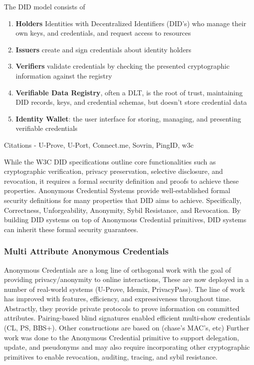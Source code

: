 The DID model consists of 
\begin{enumerate}
    \item \textbf{Holders} Identities with Decentralized Identifiers (DID's) who manage their own keys, and credentials, and request access to resources
    
    \item \textbf{Issuers} create and sign credentials about identity holders
    
    \item \textbf{Verifiers} validate credentials by checking the presented cryptographic information against the registry

    \item  \textbf{Verifiable Data Registry}, often a DLT, is the root of trust, maintaining DID records, keys, and credential schemas, but doesn't store credential data
    
    \item \textbf{Identity Wallet}: the user interface for storing, managing, and presenting verifiable credentials
\end{enumerate}
 
Citations
- U-Prove, U-Port, Connect.me, Sovrin, PingID, w3c

While the W3C DID specifications outline core functionalities such as cryptographic verification, privacy preservation, selective disclosure, and revocation, it requires a formal security definition and proofs to achieve these properties. Anonymous Credential Systems provide well-established formal security definitions for many properties that DID aims to achieve. Specifically, Correctness, Unforgeability, Anonymity, Sybil Resistance, and Revocation. By building DID systems on top of Anonymous Credential primitives, DID systems can inherit these formal security guarantees. 

\subsubsection{Multi Attribute Anonymous Credentials} 
Anonymous Credentials are a long line of orthogonal work with the goal of providing privacy/anonymity to online interactions, These are now deployed in a number of real-world systems (U-Prove, Idemix, PrivacyPass).  
The line of work has improved with features, efficiency, and expressiveness throughout time. 
Abstractly, they provide private protocols to prove information on committed attributes. 
Pairing-based blind signatures enabled efficient multi-show credentials (CL, PS, BBS+).
Other constructions are based on (chase's MAC's, etc) 
Further work was done to the Anonymous Credential primitive to support delegation, update, and pseudonyms and may also require incorporating other cryptographic primitives to enable revocation, auditing, tracing, and sybil resistance. 


